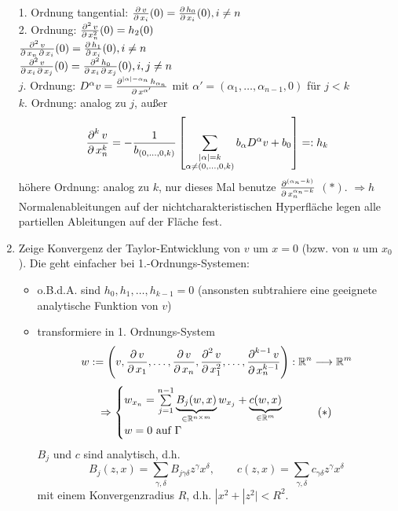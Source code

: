 \begin{enumerate}[(1)]
		1. Ordnung tangential: $\frac{\der v}{\der x_i}(0) = \frac{\der h_0}{\der x_i} (0), i \neq n$ \\
		2. Ordnung: $\frac{\der^2 v}{\der x_n^2} (0) = h_2(0)$ \\
		$\frac{\der^2 v}{\der x_n \der x_i} (0) = \frac{\der h_1}{\der x_i} (0), i \neq n$ \\
		$\frac{\der^2 v}{\der x_i \der x_j} (0) = \frac{\der^2 h_0}{\der x_i \der x_j} (0), i,j \neq n$ \\
		$j$. Ordnung: $D^\alpha v = \frac{\der^{|\alpha|-\alpha_n} h_{\alpha_n}}{\der x^{\alpha'}}$ mit $\alpha' = (\alpha_1,\dots,\alpha_{n-1},0)$ für $j < k$ \\
		$k$. Ordnung: analog zu $j$, außer
		\[ \frac{\der^k v}{\der x_n^k} = -\frac{1}{b_{(0,\dots,0,k)}} \left[ \sum\limits_{\substack{|\alpha|=k \\ \alpha \neq (0,\dots,0,k)}} b_\alpha D^\alpha v + b_0 \right] =: h_k \]
		höhere Ordnung: analog zu $k$, nur dieses Mal benutze $\frac{\der^{(\alpha_n-k)}}{\der x_n^{\alpha_n-k}}$ $(*)$.
		$\Rightarrow h$ Normalenableitungen auf der nichtcharakteristischen Hyperfläche legen alle partiellen Ableitungen auf der Fläche fest.
		\item Zeige Konvergenz der Taylor-Entwicklung von $v$ um $x=0$ (bzw. von $u$ um $x_0$). Die geht einfacher bei 1.-Ordnungs-Systemen:
		\begin{itemize}
			\item o.B.d.A. sind $h_0,h_1,\dots,h_{k-1} = 0$ (ansonsten subtrahiere eine geeignete analytische Funktion von $v$)
			\item transformiere in 1. Ordnungs-System
			\[ w := \enbrace*{v, \frac{\der v}{\der x_1},\dots,\frac{\der v}{\der x_n}, \frac{\der^2 v}{\der x_1^2}, \dots, \frac{\der^{k-1} v}{\der x_n^{k-1}}}: \RR^n \longrightarrow \RR^m \]
			\begin{equation} \Rightarrow \begin{cases}
				w_{x_n} = \sum\limits_{j=1}^{n-1} \underbrace{B_j(w,x)}_{\in \RR^{n \times m}} w_{x_j} + \underbrace{c(w,x)}_{\in \RR^m} \\
				w = 0 \text{ auf } \Gamma
			\end{cases} \tag{$*$} \end{equation}
			$B_j$ und $c$ sind analytisch, d.h.
			\[ B_j(z,x) = \sum\limits_{\gamma,\delta} B_{j\gamma\delta} z^\gamma x^\delta, \qquad c(z,x) = \sum\limits_{\gamma,\delta} c_{\gamma \delta} z^\gamma x^\delta \]
			mit einem Konvergenzradius $R$, d.h. $|x^2+|z^2| < R^2$.

\end{itemize}
\end{enumerate}
